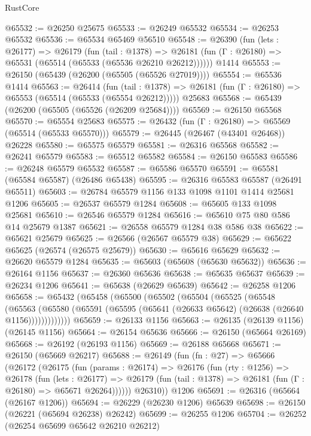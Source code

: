 \begin{lexlean}{RustCore}
\begin{coremodule}
@65532 := @26250 @25675
@65533 := @26249 @65532
@65534 := @26253 @65532
@65536 := @65534 @65469 @56510
@65548 := @26390
    (fun (lets : @26177) =>
    @26179
      (fun (tail : @1378) =>
      @26181 (fun (Γ : @26180) => @65531 (@65514 (@65533 (@65536 @26210 @26212))))))
    @1414
@65553 := @26150 (@65439 (@26200 (@65505 (@65526 @27019))))
@65554 := @65536 @1414
@65563 := @26414
    (fun (tail : @1378) => @26181 (fun (Γ : @26180) => @65553 (@65514 (@65533 (@65554 @26212)))))
    @25683
@65568 := @65439 (@26200 (@65505 (@65526 (@26209 @25684))))
@65569 := @26150 @65568
@65570 := @65554 @25683
@65575 := @26432 (fun (Γ : @26180) => @65569 (@65514 (@65533 @65570)))
@65579 := @26445 (@26467 (@43401 @26468)) @26228
@65580 := @65575 @65579
@65581 := @26316 @65568
@65582 := @26241 @65579
@65583 := @65512 @65582
@65584 := @26150 @65583
@65586 := @26248 @65579 @65532
@65587 := @65586 @65570
@65591 := @65581 (@65584 @65587) (@26486 @65438)
@65595 := @26316 @65583 @65587 (@26491 @65511)
@65603 := @26784 @65579 @1156 @133 @1098 @1101 @1414 @25681 @1206
@65605 := @26537 @65579 @1284
@65608 := @65605 @133 @1098 @25681
@65610 := @26546 @65579 @1284
@65616 := @65610 @75 @80 @586 @14 @25679 @1387
@65621 := @26558 @65579 @1284 @38 @586 @38
@65622 := @65621 @25679
@65625 := @26566 (@26567 @65579 @38)
@65629 := @65622 @65625 (@26574 (@26575 @25679))
@65630 := @65616 @65629
@65632 := @26620 @65579 @1284
@65635 := @65603 (@65608 (@65630 @65632))
@65636 := @26164 @1156
@65637 := @26360 @65636
@65638 := @65635 @65637
@65639 := @26234 @1206
@65641 := @65638 (@26629 @65639)
@65642 := @26258 @1206
@65658 := @65432
    (@65458
      (@65500
        (@65502
          (@65504
            (@65525
              (@65548
                (@65563
                  (@65580 (@65591 (@65595 (@65641 (@26633 @65642) (@26638 (@26640 @1156)))))))))))))
@65659 := @26133 @1156
@65663 := @26135 (@26139 @1156) (@26145 @1156)
@65664 := @26154 @65636
@65666 := @26150 (@65664 @26169)
@65668 := @26192 (@26193 @1156)
@65669 := @26188 @65668
@65671 := @26150 (@65669 @26217)
@65688 := @26149
    (fun (fn : @27) =>
    @65666
      (@26172
        (@26175
          (fun (params : @26174) =>
          @26176
            (fun (rty : @1256) =>
            @26178
              (fun (lets : @26177) =>
              @26179 (fun (tail : @1378) => @26181 (fun (Γ : @26180) => @65671 @26264))))))
        @26310))
    @1206
@65691 := @26316 (@65664 (@26167 @1206))
@65694 := @26229 (@26230 @1206) @65639
@65698 := @26150 (@26221 (@65694 @26238) @26242)
@65699 := @26255 @1206
@65704 := @26252 (@26254 @65699 @65642 @26210 @26212)

\end{coremodule}
\end{lexlean}
